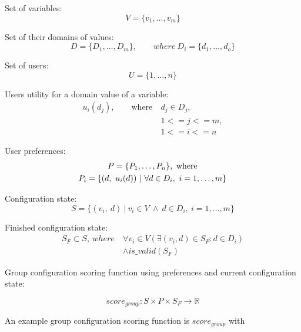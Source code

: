 \documentclass{article}
\begin{document}
Set of variables:
\begin{equation}
    V = \{v_1, \dotsc, v_m\}
\end{equation}

Set of their domains of values:
\begin{equation}
    D = \{D_1, \dotsc, D_m\}, \qquad where \ D_i = \{d_1, \dotsc, d_o\}
\end{equation}

Set of users:
\begin{equation}
    U = \{1, \dotsc, n\}
\end{equation}

Users utility for a domain value of a variable:
\begin{equation}
    \begin{split}
        u_i(d_j), \qquad \text{where}\ & d_j \in D_j,\\
        & 1 <= j <= m, \\
        & 1 <= i <= n
    \end{split}
\end{equation}

User preferences:
\begin{gather}
    P = \{ P_1, \dotsc, P_n\},\ \text{where} \\
    P_i = \{(d,\ u_i(d)) \ | \ \forall d \in D_i,\ i=1,\dotsc,m \} \notag
\end{gather}

Configuration state:
\begin{equation}
    S = \{ (v_i,\ d) \ |\ v_i \in V \ \land \ d \in D_i,\ i=1,\dotsc,m \}
\end{equation}

Finished configuration state:
\begin{equation}
\begin{split}
    S_F \subset S,\ where \  & \forall v_i \in V (\exists (v_i, d) \in S_F : d \in D_i) \\
    & \land is\_valid(S_F)
\end{split}
\end{equation}


Group configuration scoring function using preferences and current configuration state:

\begin{equation}
    score_{group}: S \times P \times S_F \to \mathbb{R}
\end{equation}

An example group configuration scoring function is $score_{group}$ with
\end{document}
